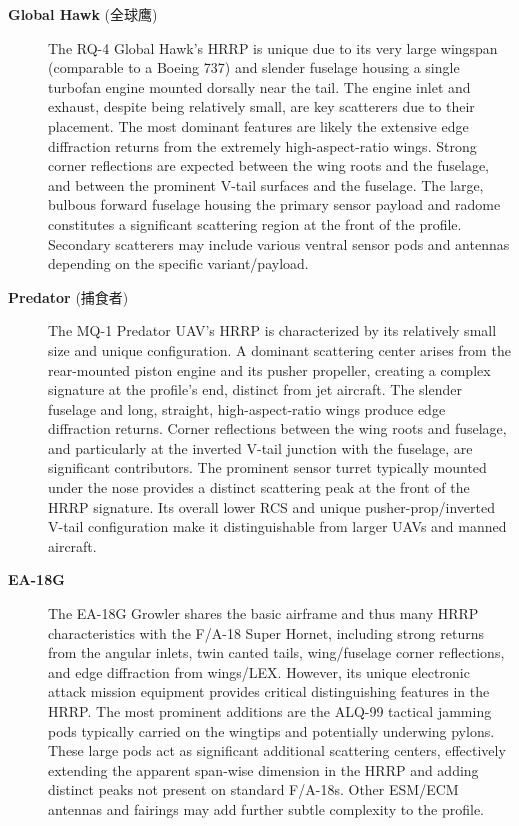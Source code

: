 {\begin{description}
    \item[\textbf{Global Hawk} (全球鹰)]
    The RQ-4 Global Hawk's HRRP is unique due to its very large wingspan (comparable to a Boeing 737) and slender fuselage housing a single turbofan engine mounted dorsally near the tail. The engine inlet and exhaust, despite being relatively small, are key scatterers due to their placement. The most dominant features are likely the extensive edge diffraction returns from the extremely high-aspect-ratio wings. Strong corner reflections are expected between the wing roots and the fuselage, and between the prominent V-tail surfaces and the fuselage. The large, bulbous forward fuselage housing the primary sensor payload and radome constitutes a significant scattering region at the front of the profile. Secondary scatterers may include various ventral sensor pods and antennas depending on the specific variant/payload.

    \item[\textbf{Predator} (捕食者)]
    The MQ-1 Predator UAV's HRRP is characterized by its relatively small size and unique configuration. A dominant scattering center arises from the rear-mounted piston engine and its pusher propeller, creating a complex signature at the profile's end, distinct from jet aircraft. The slender fuselage and long, straight, high-aspect-ratio wings produce edge diffraction returns. Corner reflections between the wing roots and fuselage, and particularly at the inverted V-tail junction with the fuselage, are significant contributors. The prominent sensor turret typically mounted under the nose provides a distinct scattering peak at the front of the HRRP signature. Its overall lower RCS and unique pusher-prop/inverted V-tail configuration make it distinguishable from larger UAVs and manned aircraft.

    \item[\textbf{EA-18G}]
    The EA-18G Growler shares the basic airframe and thus many HRRP characteristics with the F/A-18 Super Hornet, including strong returns from the angular inlets, twin canted tails, wing/fuselage corner reflections, and edge diffraction from wings/LEX. However, its unique electronic attack mission equipment provides critical distinguishing features in the HRRP. The most prominent additions are the ALQ-99 tactical jamming pods typically carried on the wingtips and potentially underwing pylons. These large pods act as significant additional scattering centers, effectively extending the apparent span-wise dimension in the HRRP and adding distinct peaks not present on standard F/A-18s. Other ESM/ECM antennas and fairings may add further subtle complexity to the profile.


\end{description}}
